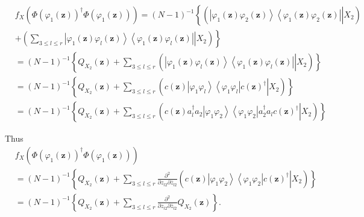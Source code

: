\documentclass[aps,preprint]{revtex4}%
\begin{document}
\bigskip%
\begin{align}
&  f_{X}\left(  \Phi\left(  \varphi_{1}\left(  \mathbf{z}\right)  \right)
^{\dagger}\Phi\left(  \varphi_{1}\left(  \mathbf{z}\right)  \right)  \right)
=\left(  N-1\right)  ^{-1}\left\{  \left(  \left.  \overset{}{\left\vert
\varphi_{1}\left(  \mathbf{z}\right)  \varphi_{2}\left(  \mathbf{z}\right)
\right\rangle \left\langle \varphi_{1}\left(  \mathbf{z}\right)  \varphi
_{2}\left(  \mathbf{z}\right)  \right\vert }\right\vert X_{2}\right)  \right.
\nonumber\\
&  \left.  +\left(  \left.  \sum_{3\leq l\leq r}\left\vert \varphi_{1}\left(
\mathbf{z}\right)  \varphi_{l}\left(  \mathbf{z}\right)  \right\rangle
\left\langle \varphi_{1}\left(  \mathbf{z}\right)  \varphi_{l}\left(
\mathbf{z}\right)  \right\vert \right\vert X_{2}\right)  \right\} \nonumber\\
&  =\left(  N-1\right)  ^{-1}\left\{  Q_{X_{2}}\left(  \mathbf{z}\right)
+\sum_{3\leq l\leq r}\left(  \left.  \overset{}{\left\vert \varphi_{1}\left(
\mathbf{z}\right)  \varphi_{l}\left(  \mathbf{z}\right)  \right\rangle
\left\langle \varphi_{1}\left(  \mathbf{z}\right)  \varphi_{l}\left(
\mathbf{z}\right)  \right\vert }\right\vert X_{2}\right)  \right\} \nonumber\\
&  =\left(  N-1\right)  ^{-1}\left\{  Q_{X_{2}}\left(  \mathbf{z}\right)
+\sum_{3\leq l\leq r}\left(  \left.  \overset{}{c\left(  \mathbf{z}\right)
\left\vert \varphi_{1}\varphi_{l}\right\rangle \left\langle \varphi_{1}%
\varphi_{l}\right\vert c\left(  \mathbf{z}\right)  ^{\dagger}}\right\vert
X_{2}\right)  \right\} \nonumber\\
&  =\left(  N-1\right)  ^{-1}\left\{  Q_{X_{2}}\left(  \mathbf{z}\right)
+\sum_{3\leq l\leq r}\left(  \left.  \overset{}{c\left(  \mathbf{z}\right)
a_{l}^{\dagger}a_{2}\left\vert \varphi_{1}\varphi_{2}\right\rangle
\left\langle \varphi_{1}\varphi_{2}\right\vert a_{2}^{\dagger}a_{l}c\left(
\mathbf{z}\right)  ^{\dagger}}\right\vert X_{2}\right)  \right\}
\end{align}


Thus%
\begin{align}
&  f_{X}\left(  \Phi\left(  \varphi_{1}\left(  \mathbf{z}\right)  \right)
^{\dagger}\Phi\left(  \varphi_{1}\left(  \mathbf{z}\right)  \right)  \right)
\nonumber\\
&  =\left(  N-1\right)  ^{-1}\left\{  Q_{X_{2}}\left(  \mathbf{z}\right)
+\sum\limits_{3\leq l\leq r}\frac{\partial^{2}}{\partial z_{l2}\partial\bar
{z}_{l2}}\left(  \left.  \overset{}{c\left(  \mathbf{z}\right)  \left\vert
\varphi_{1}\varphi_{2}\right\rangle \left\langle \varphi_{1}\varphi
_{2}\right\vert c\left(  \mathbf{z}\right)  ^{\dagger}}\right\vert
X_{2}\right)  \right\} \nonumber\\
&  =\left(  N-1\right)  ^{-1}\left\{  Q_{X_{2}}\left(  \mathbf{z}\right)
+\sum\limits_{3\leq l\leq r}\frac{\partial^{2}}{\partial z_{l2}\partial\bar
{z}_{l2}}Q_{X_{2}}\left(  \mathbf{z}\right)  \right\}  .
\end{align}
\end{document}
